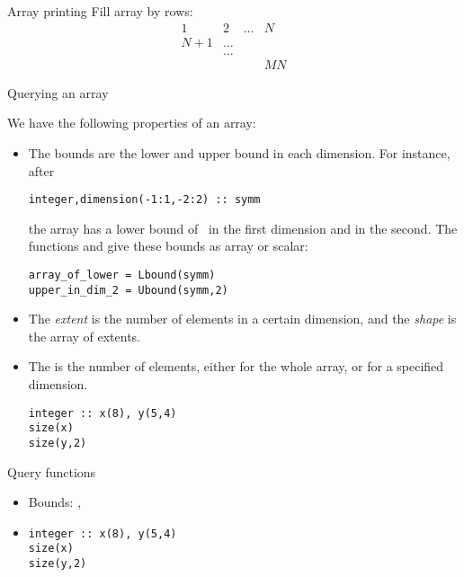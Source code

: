 \begin{block}{Array printing}
  \label{sl:farray-print}
  Fill array by rows:
  \[ \begin{matrix}1&2&\ldots&N\\ N+1&\ldots\\ &\ldots\\ &&&MN
  \end{matrix}
  \]
\end{block}

 {Querying an array}

We have the following properties of an array:
\begin{itemize}
\item The bounds are the lower and upper bound in each dimension.
  For instance, after
\begin{verbatim}
integer,dimension(-1:1,-2:2) :: symm
\end{verbatim}
the array  has a lower bound of~ in the first dimension
and  in the second. The functions  and
 give these bounds as array or scalar:
\begin{verbatim}
array_of_lower = Lbound(symm)
upper_in_dim_2 = Ubound(symm,2)
\end{verbatim}


\item The \emph{extent} is the number
  of elements in a certain dimension, and the
  \emph{shape} is the array of extents.

\item The  is the number of elements, either for
  the whole array, or for a specified dimension.
\begin{verbatim}
integer :: x(8), y(5,4)
size(x)
size(y,2)
\end{verbatim}
\end{itemize}

\begin{slide}{Query functions}
  \label{sl:farray-query}
    \begin{itemize}
    \item Bounds: , 
    \item {}
\begin{verbatim}
integer :: x(8), y(5,4)
size(x)
size(y,2)
\end{verbatim}
    \end{itemize}
\end{slide}

